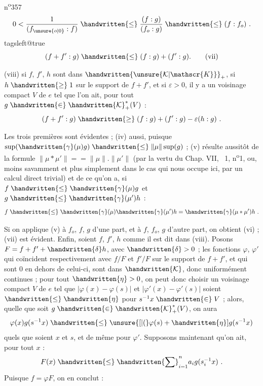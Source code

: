 n\textsuperscript{o}357
\[
0<\frac{1}{(f_{\unsure{o|0}}:f)}\mathrel{\handwritten{\leq}}\frac{(f:g)}{(f_o:g)}\mathrel{\handwritten{\leq}}(f:f_o)\ .
\]
\begingroup\csname tagsleft@true\endcsname\[
(f+f':g)\mathrel{\handwritten{\leq}}(f:g)+(f':g).\tag*{(vii)}
\]\endgroup

(viii) \quad si $f$, $f'$, $h$ sont dans $\handwritten{\unsure{\mathcal{K}|\mathscr{K}}}_+$, si $h\mathrel{\handwritten{\geq}}1$ sur le support de $f+f'$, et si $\varepsilon>0$, il y a un voisinage compact $V$ de $e$ tel que l'on ait, pour tout $g\mathrel{\handwritten{\in}}\handwritten{\mathcal{K}}^{\ast}_{+}(V)$ :
\[
(f+f':g)\mathrel{\handwritten{\geq}}(f:g)+(f':g)-\varepsilon(h:g)\ .
\]

Les trois premières sont évidentes ; (iv) aussi, puisque $\sup(\handwritten{\gamma}(\mu)g)\mathrel{\handwritten{\leq}}\lVert\mu\rVert\sup(g)$ ; (v) résulte aussitôt de la formule $\lVert\mu\ast\mu'\rVert={ }=\lVert\mu\rVert.\lVert\mu'\rVert$ (par la vertu du Chap. VII, \handwritten{\S}\ 1, n\textsuperscript{o}1, ou, moins savamment et plus simplement dans le cas qui nous occupe ici, par un calcul direct trivial) et de ce qu'on a, si $f\mathrel{\handwritten{\leq}}\handwritten{\gamma}(\mu)g$ et $g\mathrel{\handwritten{\leq}}\handwritten{\gamma}(\mu')h$ :
\[
f\mathrel{\handwritten{\leq}}\handwritten{\gamma}(\mu)\handwritten{\gamma}(\mu')h=\handwritten{\gamma}(\mu\ast\mu')h\ .
\]

Si on applique (v) à $f_o$, $f$, $g$ d'une part, et à $f$, $f_o$, $g$ d'autre part, on obtient (vi) ; (vii) est évident. Enfin, soient $f$, $f'$, $h$ comme il est dit dans (viii). Posons $F=f+f'+\handwritten{\delta} h$, avec $\handwritten{\delta}>0$ ; les fonctions $\varphi$, $\varphi'$ qui coïncident respectivement avec $f/F$ et $f'/F$ sur le support de $f+f'$, et qui sont $0$ en dehors de celui-ci, sont dans $\handwritten{\mathcal{K}}$, donc uniformément continues ; pour tout $\handwritten{\eta}>0$, on peut donc choisir un voisinage compact $V$ de $e$ tel que $|\varphi(x)-\varphi(s)|$ et $|\varphi'(x)-\varphi'(s)|$ soient $\mathrel{\handwritten{\leq}}\handwritten{\eta}$ pour $s^{-1}x\mathrel{\handwritten{\in}}V$ ; alors, quelle que soit $g\mathrel{\handwritten{\in}}\handwritten{\mathcal{K}}^{\ast}_{+}(V)$, on aura
\[
\varphi(x)g(s^{-1}x)\mathrel{\handwritten{\leq}}\unsure{[|(}\varphi(s)+\handwritten{\eta}]g(s^{-1}x)
\]
quels que soient $x$ et $s$, et de même pour $\varphi'$. Supposons maintenant qu'on ait, pour tout $x$ :
\[
F(x)\mathrel{\handwritten{\leq}}\handwritten{\sum}_{i=1}^{n}a_i g(s_i^{-1}x)\ .
\]
Puisque $f=\varphi F$, on en conclut :

